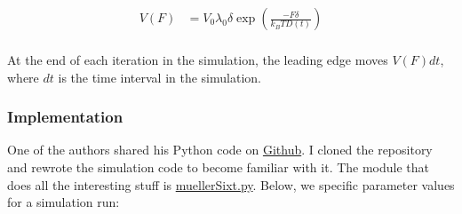\documentclass[11pt]{article}
\begin{document}
\begin{align*}
V(F) &= V_0 \lambda_0 \delta \exp(\frac{-F \delta}{k_B T D(t)}) \\
\end{align*}

At the end of each iteration in the simulation, the leading edge moves
\(V(F) dt\), where \(dt\) is the time interval in the simulation.

\subsubsection{Implementation}\label{implementation}

One of the authors shared his Python code on
\href{https://github.com/gszep/lamellipodium}{Github}. I cloned the
repository and rewrote the simulation code to become familiar with it.
The module that does all the interesting stuff is
\href{https://jupyter.ucsf.edu:8888/edit/branched-networks/branchedNetwork.py}{muellerSixt.py}.
Below, we specific parameter values for a simulation run:
\end{document}
